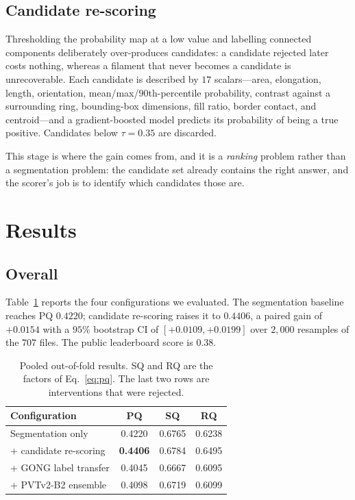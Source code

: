 \documentclass[conference]{IEEEtran}
\begin{document}
\subsection{Candidate re-scoring}

Thresholding the probability map at a low value and labelling connected
components deliberately over-produces candidates: a candidate rejected later
costs nothing, whereas a filament that never becomes a candidate is
unrecoverable. Each candidate is described by $17$ scalars---area, elongation,
length, orientation, mean/max/$90$th-percentile probability, contrast against a
surrounding ring, bounding-box dimensions, fill ratio, border contact, and
centroid---and a gradient-boosted model predicts its probability of being a true
positive. Candidates below $\tau=0.35$ are discarded.

This stage is where the gain comes from, and it is a \emph{ranking} problem
rather than a segmentation problem: the candidate set already contains the right
answer, and the scorer's job is to identify which candidates those are.

\section{Results}

\subsection{Overall}

Table~\ref{tab:results} reports the four configurations we evaluated. The
segmentation baseline reaches PQ $0.4220$; candidate re-scoring raises it to
$0.4406$, a paired gain of $+0.0154$ with a $95\%$ bootstrap CI of
$[+0.0109, +0.0199]$ over $2{,}000$ resamples of the $707$ files. The public
leaderboard score is $0.38$.

\begin{table}[t]
\centering
\caption{Pooled out-of-fold results. SQ and RQ are the factors of
Eq.~\ref{eq:pq}. The last two rows are interventions that were rejected.}
\label{tab:results}
\small
\begin{tabular}{@{}lccc@{}}
\toprule
Configuration & PQ & SQ & RQ \\
\midrule
Segmentation only        & 0.4220 & 0.6765 & 0.6238 \\
+ candidate re-scoring   & \textbf{0.4406} & 0.6784 & 0.6495 \\
\midrule
+ GONG label transfer    & 0.4045 & 0.6667 & 0.6095 \\
+ PVTv2-B2 ensemble      & 0.4098 & 0.6719 & 0.6099 \\
\bottomrule
\end{tabular}
\end{table}
\end{document}

